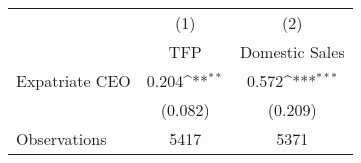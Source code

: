 {
\def\sym#1{\ifmmode^{#1}\else\(^{#1}\)\fi}
\begin{tabular}{l*{2}{c}}
\hline\hline
                    &\multicolumn{1}{c}{(1)}&\multicolumn{1}{c}{(2)}\\
                    &\multicolumn{1}{c}{TFP}&\multicolumn{1}{c}{Domestic Sales}\\
\hline
Expatriate CEO      &       0.204\sym{**} &       0.572\sym{***}\\
                    &     (0.082)         &     (0.209)         \\
\hline
Observations        &        5417         &        5371         \\
\hline\hline
\end{tabular}
}
